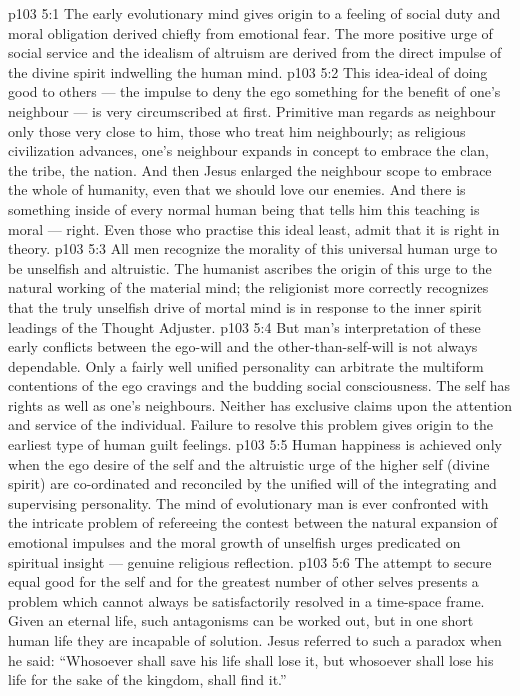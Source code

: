 \vs p103 5:1 The early evolutionary mind gives origin to a feeling of social duty and moral obligation derived chiefly from emotional fear. The more positive urge of social service and the idealism of altruism are derived from the direct impulse of the divine spirit indwelling the human mind.
\vs p103 5:2 This idea\hyp{}ideal of doing good to others --- the impulse to deny the ego something for the benefit of one’s neighbour --- is very circumscribed at first. Primitive man regards as neighbour only those very close to him, those who treat him neighbourly; as religious civilization advances, one’s neighbour expands in concept to embrace the clan, the tribe, the nation. And then Jesus enlarged the neighbour scope to embrace the whole of humanity, even that we should love our enemies. And there is something inside of every normal human being that tells him this teaching is moral --- right. Even those who practise this ideal least, admit that it is right in theory.
\vs p103 5:3 All men recognize the morality of this universal human urge to be unselfish and altruistic. The humanist ascribes the origin of this urge to the natural working of the material mind; the religionist more correctly recognizes that the truly unselfish drive of mortal mind is in response to the inner spirit leadings of the Thought Adjuster.
\vs p103 5:4 But man’s interpretation of these early conflicts between the ego\hyp{}will and the other\hyp{}than\hyp{}self\hyp{}will is not always dependable. Only a fairly well unified personality can arbitrate the multiform contentions of the ego cravings and the budding social consciousness. The self has rights as well as one’s neighbours. Neither has exclusive claims upon the attention and service of the individual. Failure to resolve this problem gives origin to the earliest type of human guilt feelings.
\vs p103 5:5 Human happiness is achieved only when the ego desire of the self and the altruistic urge of the higher self (divine spirit) are co\hyp{}ordinated and reconciled by the unified will of the integrating and supervising personality. The mind of evolutionary man is ever confronted with the intricate problem of refereeing the contest between the natural expansion of emotional impulses and the moral growth of unselfish urges predicated on spiritual insight --- genuine religious reflection.
\vs p103 5:6 The attempt to secure equal good for the self and for the greatest number of other selves presents a problem which cannot always be satisfactorily resolved in a time\hyp{}space frame. Given an eternal life, such antagonisms can be worked out, but in one short human life they are incapable of solution. Jesus referred to such a paradox when he said: “Whosoever shall save his life shall lose it, but whosoever shall lose his life for the sake of the kingdom, shall find it.”
